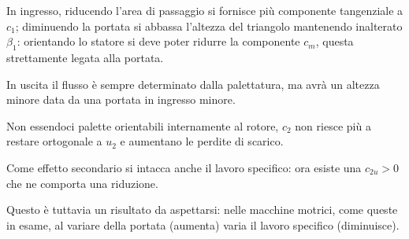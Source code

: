 \documentclass[a4paper, 15pt]{article}
\begin{document}
\begin{adjustwidth}{2in}{}
	In ingresso, riducendo l'area di passaggio si fornisce più componente tangenziale a $c_1$; diminuendo la portata si abbassa l'altezza del triangolo mantenendo inalterato $\beta_1$: orientando lo statore si deve poter ridurre la componente $c_m$, questa strettamente legata alla portata. \newline 
	
	In uscita il flusso è sempre determinato dalla palettatura, ma avrà un altezza minore data da una portata in ingresso minore.
	
	Non essendoci palette orientabili internamente al rotore, $c_2$ non riesce più a restare ortogonale a $u_2$ e aumentano le perdite di scarico. \newline 
	
	Come effetto secondario si intacca anche il lavoro specifico: ora esiste una $c_{2u}>0$ che ne comporta una riduzione. 
	
	Questo è tuttavia un risultato da aspettarsi: nelle macchine motrici, come queste in esame, al variare della portata (aumenta) varia il lavoro specifico (diminuisce).	
\end{adjustwidth}		
		
		
\end{document}
